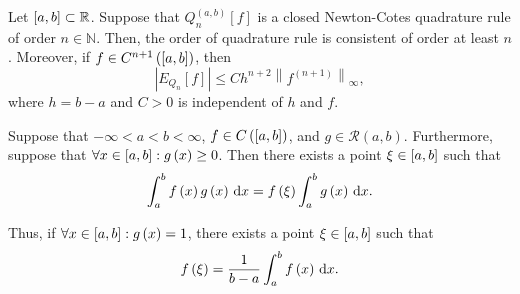 \begin{frame}
    \begin{theorem}
        Let
        \begin{math}
            \left[a,b\right]\subset
            \mathbb{R}
        \end{math}.
        Suppose that $Q^{\left(a,b\right)}_{n}\left[f\right]$ is a
        closed Newton-Cotes quadrature rule of order
        $n\in\mathbb{N}$.
        Then, the order of quadrature rule is consistent of order at
        least $n$.
        Moreover, if $f\in C^{n+1}\left(\left[a,b\right]\right)$, then
        \begin{equation*}
            \left|
            E_{Q_{n}}
            \left[f\right]
            \right|\leq
            C
            h^{n+2}
            {\left\|f^{\left(n+1\right)}\right\|}_{\infty},
        \end{equation*}
        where $h=b-a$ and $C>0$ is independent of $h$ and $f$.
    \end{theorem}

    \begin{theorem}
        Suppose that
        \begin{math}
            -\infty<a<b<\infty
        \end{math},
        \begin{math}
            f\in
            C\left(\left[a,b\right]\right)
        \end{math},
        and
        \begin{math}
            g\in
            \mathcal{R}
            \left(a,b\right)
        \end{math}.
        Furthermore, suppose that
        \begin{math}
            \forall x\in\left[a,b\right]:
            g\left(x\right)\geq0
        \end{math}.
        Then there exists a point $\xi\in\left[a,b\right]$ such that
        \begin{equation*}
            \int_{a}^{b}
            f\left(x\right)
            g\left(x\right)
            \dl x=
            f\left(\xi\right)
            \int_{a}^{b}
            g\left(x\right)
            \dl x.
        \end{equation*}

        Thus, if
        \begin{math}
            \forall x\in
            \left[a,b\right]:
            g\left(x\right)=
            1
        \end{math},
        there exists a point $\xi\in\left[a,b\right]$ such that
        \begin{equation*}
            f\left(\xi\right)=
            \dfrac{1}{b-a}
            \int_{a}^{b}
            f\left(x\right)
            \dl x.
        \end{equation*}
    \end{theorem}
\end{frame}

